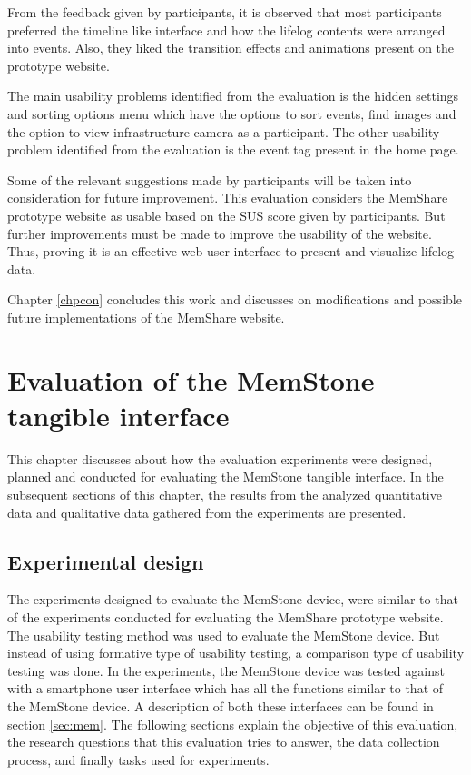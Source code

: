 \documentclass[mscthesis]{usiinfthesis}
\begin{document}
From the feedback given by participants, it is observed that most participants preferred the timeline like interface and how the lifelog contents were arranged into events. Also, they liked the transition effects and animations present on the prototype website. 

The main usability problems identified from the evaluation is the hidden settings and sorting options menu which have the options to sort events, find images and the option to view infrastructure camera as a participant. The other usability problem identified from the evaluation is the event tag present in the home page. 

Some of the relevant suggestions made by participants will be taken into consideration for future improvement. This evaluation considers the MemShare prototype website as usable based on the SUS score given by participants. But further improvements must be made to improve the usability of the website. Thus, proving it is an effective web user interface to present and visualize lifelog data.   

Chapter \ref{chpcon} concludes this work and discusses on modifications and possible future implementations of the MemShare website.


\chapter{Evaluation of the MemStone tangible interface}

This chapter discusses about how the evaluation experiments were designed, planned and conducted for evaluating the MemStone tangible interface. In the subsequent sections of this chapter, the results from the analyzed quantitative data and qualitative data gathered from the experiments are presented. 

\section{Experimental design}
The experiments designed to evaluate the MemStone device, were similar to that of the experiments conducted for evaluating the MemShare prototype website. The usability testing method was used to evaluate the MemStone device. But instead of using formative type of usability testing, a comparison type of usability testing was done. In the experiments, the MemStone device was tested against with a smartphone user interface which has all the functions similar to that of the MemStone device. A description of both these interfaces can be found in section \ref{sec:mem}. The following sections explain the objective of this evaluation, the research questions that this evaluation tries to answer, the data collection process, and finally tasks used for experiments.
\end{document}
